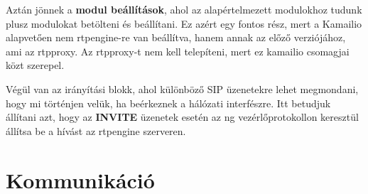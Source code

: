 Aztán jönnek a \textbf{modul beállítások}, ahol az alapértelmezett modulokhoz tudunk plusz
modulokat betölteni és beállítani. Ez azért egy fontos rész, mert a Kamailio alapvetően 
nem rtpengine-re van beállítva, hanem annak az előző verziójához, ami az rtpproxy. 
Az rtpproxy-t nem kell telepíteni, mert ez kamailio csomagjai közt szerepel. 

Végül van az irányítási blokk, ahol különböző SIP üzenetekre lehet megmondani, hogy mi
történjen velük, ha beérkeznek a hálózati interfészre. Itt betudjuk állítani azt, hogy
az \textbf{INVITE} üzenetek esetén az ng vezérlőprotokollon keresztül állítsa be a hívást
az rtpengine szerveren.

\section{Kommunikáció}

